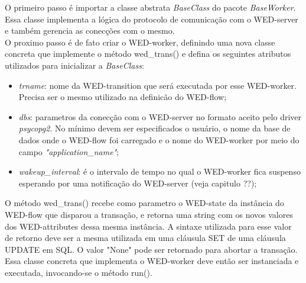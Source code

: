 \documentclass[conference]{IEEEtran}
\begin{document}
O primeiro passo é importar a classe abstrata \emph{BaseClass} do pacote \emph{BaseWorker}. Essa classe implementa a lógica do protocolo
de comunicação com o WED-server e também gerencia as conecções com o mesmo. 
\\
\indent  O proximo passo é de fato criar o WED-worker, definindo uma nova classe concreta que implemente o método wed\_trans() e
defina os seguintes atributos utilizados para inicializar a \emph{BaseClass}:
\begin{itemize}
\item \emph{trname}: nome da WED-transition que será executada por esse WED-worker. Precisa ser o mesmo utilizado na definicão
           do WED-flow;
\item \emph{dbs}: parametros da conecção com o WED-server no formato aceito pelo driver \emph{psycopg2}. No mínimo devem ser especificados
        o usuário, o nome da base de dados onde o WED-flow foi carregado e o nome do WED-worker por meio do campo \emph{"application\_name"};
\item \emph{wakeup\_interval}: é o intervalo de tempo no qual o WED-worker fica suspenso esperando por uma notificação do WED-server (veja capitulo ??);
\end{itemize}
  O método wed\_trans() recebe como parametro o WED-state da instância do WED-flow que disparou a transação, e retorna uma 
string com os novos valores dos WED-attributes dessa mesma instância. A sintaxe utilizada para esse valor de retorno deve
ser a mesma utilizada em uma cláusula SET de uma cláusula UPDATE em SQL. O valor "None" pode ser retornado para abortar
a transação. Essa classe concreta que implementa o WED-worker deve então ser instanciada e executada, invocando-se o método run().
\end{document}

